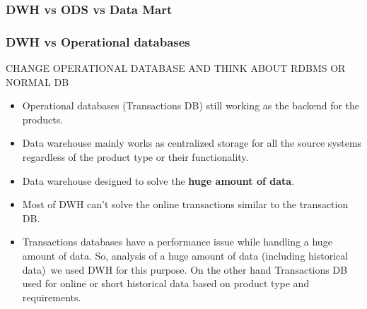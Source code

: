 

\begin{frame}
\frametitle{DWH vs ODS vs Data Mart}


\begin{table}[t]
	\centering	
\end{table}
\end{frame}



\begin{frame}
\frametitle{DWH vs Operational databases}
CHANGE OPERATIONAL DATABASE AND THINK ABOUT RDBMS OR NORMAL DB
\begin{itemize}[<+->]
		\item Operational databases (Transactions DB) still working as the backend for the products.
		\item Data warehouse mainly works as centralized storage for all the source systems regardless of the product type or their functionality.
		\item Data warehouse designed to solve the \textbf{huge amount of data}.
		\item Most of DWH can't solve the online transactions similar to the transaction DB.
		\item Transactions databases have a performance issue while handling a huge amount of data. So, analysis of a huge amount of data (including historical data) we used DWH for this purpose. On the other hand Transactions DB used for online or short historical data based on product type and requirements.
\end{itemize}
\end{frame}


